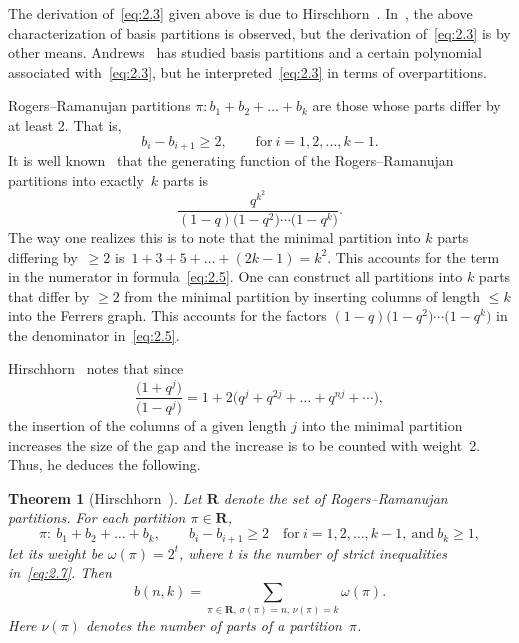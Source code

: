 \documentclass[pdftex]{sigma}
\numberwithin{equation}{section}
\newtheorem{Theorem}{Theorem}[section]
\theoremstyle{definition}
\begin{document}
The derivation of~\eqref{eq:2.3} given above is due to Hirschhorn~\cite{Hi0099}.
In~\cite{No-Sa-Wi0098}, the above characterization of basis partitions is observed,
but the derivation of~\eqref{eq:2.3} is by other means. Andrews~\cite{An2015} has studied basis partitions and a certain polynomial associated with~\eqref{eq:2.3}, but he interpreted~\eqref{eq:2.3} in terms of overpartitions.

Rogers--Ramanujan partitions $\pi\colon b_1+b_2+\dots +b_k$ are those whose
parts differ by at least 2. That is,
\begin{equation*}
b_i-b_{i+1}\ge 2, \qquad \text{for} \ i=1,2,\dots , k-1.%
\end{equation*}
It is well known~\cite{An-book} that the generating function of the Rogers--Ramanujan
partitions into exactly~$k$ parts is
\begin{equation}
\frac{q^{k^2}}{(1-q)\bigl(1-q^2\bigr)\cdots \bigl(1-q^k\bigr)}.\label{eq:2.5}
\end{equation}
The way one realizes this is to note that the minimal partition into
$k$ parts differing by~\mbox{$\ge 2$} is~$1+3+5+\dots + (2k-1)=k^2$. This accounts
for the term  in the numerator in formula~\eqref{eq:2.5}. One can construct all
partitions into $k$ parts that differ by $\ge 2$ from the minimal partition
by inserting columns of length $\le k$ into the Ferrers graph. This accounts
for the factors ${(1-q)\bigl(1-q^2\bigr)\cdots \bigl(1-q^k\bigr)}$ in the denominator in~\eqref{eq:2.5}.

Hirschhorn~\cite{Hi0099} notes that since
\begin{equation*}
\frac{\bigl(1+q^j\bigr)}{\bigl(1-q^j\bigr)}=1+2\bigl(q^j+q^{2j}+\dots +q^{nj}+\cdots \bigr),%
\end{equation*}
the insertion of the columns of a given length $j$ into the minimal
partition increases the size of the gap and the increase is to be counted
with weight~2. Thus, he deduces the following.

\begin{Theorem}[{Hirschhorn~\cite{Hi0099}}]\label{thm:1}
Let $\mathbf{R}$ denote the set of Rogers--Ramanujan partitions. For
each partition $\pi\in \mathbf{R}$,
\begin{equation}
\pi\colon\ b_1+b_2+\dots +b_k, \qquad b_i-b_{i+1}\ge 2 \quad \text{for} \
i=1,2,\dots , k-1, \ \text{and} \ b_k\ge 1, \label{eq:2.7}
\end{equation}
let its weight be $\omega(\pi)=2^t$, where t is the number of
strict inequalities in~\eqref{eq:2.7}. Then
\[
b(n,k)=\sum_{\pi\in \mathbf{R},\, \sigma(\pi)=n,\, \nu(\pi)=k}\omega(\pi).
\]
Here $\nu(\pi)$ denotes the number of parts of a partition~$\pi$.
\end{Theorem}
\end{document}

